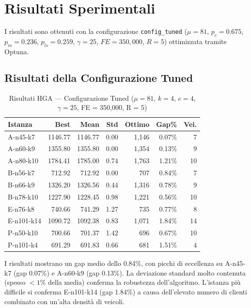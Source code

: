 \section{Risultati Sperimentali}

I risultati sono ottenuti con la configurazione \texttt{config\_tuned}
($\mu=81$, $p_c=0.675$, $p_m=0.236$, $p_{ls}=0.259$, $\gamma=25$,
$FE=350{,}000$, $R=5$) ottimizzata tramite Optuna.

\subsection{Risultati della Configurazione Tuned}

\begin{table}[H]
\centering
\caption{Risultati HGA --- Configurazione Tuned ($\mu=81$, $k=4$, $e=4$, $\gamma=25$, FE = 350{,}000, R = 5)}
\label{tab:results-tuned}
\footnotesize
\begin{tabular}{@{}lrrrrrr@{}}
\toprule
\textbf{Istanza} & \textbf{Best} & \textbf{Mean} & \textbf{Std} & \textbf{Ottimo} & \textbf{Gap\%} & \textbf{Vei.} \\
\midrule
A-n45-k7     &  1146.77 &  1146.77 &  0.00 &   1{,}146 &  0.07\% &  7 \\
A-n60-k9     &  1355.80 &  1355.80 &  0.00 &   1{,}354 &  0.13\% &  9 \\
A-n80-k10    &  1784.41 &  1785.00 &  0.74 &   1{,}763 &  1.21\% & 10 \\
B-n56-k7     &   712.92 &   712.92 &  0.00 &     707 &  0.84\% &  7 \\
B-n66-k9     &  1326.20 &  1326.56 &  0.44 &   1{,}316 &  0.78\% &  9 \\
B-n78-k10    &  1227.90 &  1228.45 &  0.98 &   1{,}221 &  0.56\% & 10 \\
E-n76-k8     &   740.66 &   741.29 &  1.27 &     735 &  0.77\% &  8 \\
E-n101-k14   &  1090.72 &  1092.38 &  0.83 &   1{,}071 &  1.84\% & 14 \\
P-n50-k10    &   700.66 &   701.37 &  1.42 &     696 &  0.67\% & 10 \\
P-n101-k4    &   691.29 &   691.83 &  0.66 &     681 &  1.51\% &  4 \\
\bottomrule
\end{tabular}
\end{table}

I risultati mostrano un gap medio dello 0.84\%, con picchi di eccellenza
su A-n45-k7 (gap 0.07\%) e A-n60-k9 (gap 0.13\%). La deviazione standard molto
contenuta (spesso $< 1\%$ della media) conferma la robustezza dell'algoritmo.
L'istanza pi\`u difficile si conferma E-n101-k14 (gap 1.84\%) a causa dell'elevato
numero di clienti combinato con un'alta densit\`a di veicoli.

